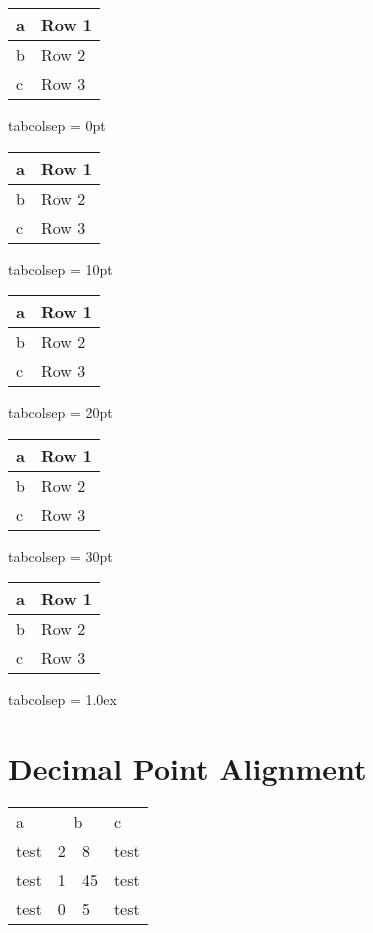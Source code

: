 			\setlength{\tabcolsep}{0pt}
			\begin{tabular}{|l|l|}
			\hline
			a & Row 1 \\ \hline
			b & Row 2 \\ \hline
			c & Row 3 \\ \hline
			\end{tabular}			tabcolsep = 0pt
	
			\setlength{\tabcolsep}{10pt}
			\begin{tabular}{|l|l|}
			\hline
			a & Row 1 \\ \hline
			b & Row 2 \\ \hline
			c & Row 3 \\ \hline
			\end{tabular}			tabcolsep = 10pt
			
			\setlength{\tabcolsep}{20pt}
			\begin{tabular}{|l|l|}
			\hline
			a & Row 1 \\ \hline
			b & Row 2 \\ \hline
			c & Row 3 \\ \hline
			\end{tabular}			tabcolsep = 20pt
			
			\setlength{\tabcolsep}{30pt}
			\begin{tabular}{|l|l|}
			\hline
			a & Row 1 \\ \hline
			b & Row 2 \\ \hline
			c & Row 3 \\ \hline
			\end{tabular}			tabcolsep = 30pt
			
			\setlength{\tabcolsep}{1.0ex}
			\begin{tabular}{|l|l|}
			\hline
			a & Row 1 \\ \hline
			b & Row 2 \\ \hline
			c & Row 3 \\ \hline
			\end{tabular}			tabcolsep = 1.0ex
			\setlength{\tabcolsep}{6pt}
	
	
	
	
\newpage  
\section{Decimal Point Alignment}
\null


\begin{tabular}{|l|r@{.}l|l|}
a & \multicolumn{2}{c|}{b} & c \\
test & 2 & 8 & test \\
test & 1 & 45 & test \\
test & 0 & 5 & test
\end{tabular}


